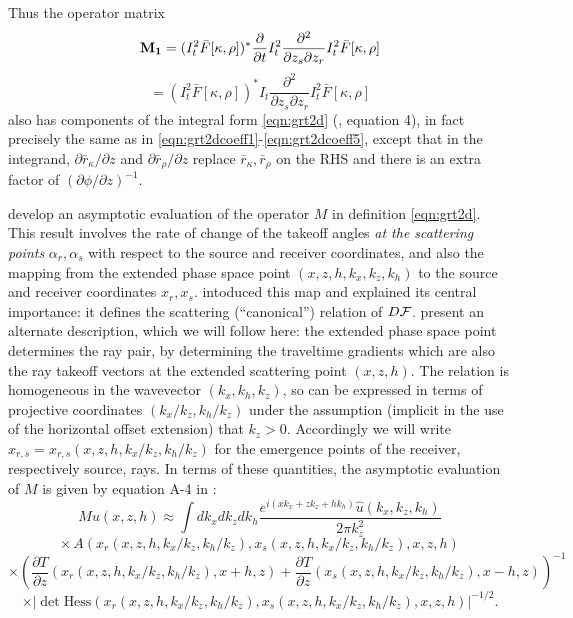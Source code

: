 Thus the operator matrix 
\[
{\bf M_1} = (I_t^2\bar{F}[\kappa,\rho])^{*}
\frac{\partial}{\partial t}I_t^2\frac{\partial^2}{\partial z_s \partial z_r}I_t^2\bar{F}[\kappa,\rho]
\]
\begin{equation}
\label{eqn:dwnopbis}
 = (I_t^2\bar{F}[\kappa,\rho])^{*}
I_t\frac{\partial^2}{\partial z_s \partial z_r}I_t^2\bar{F}[\kappa,\rho]
\end{equation}
also has components of the integral form \ref{eqn:grt2d}  
(\cite{HouSymes:17}, equation 4), in fact precisely the same as in
\ref{eqn:grt2dcoeff1}-\ref{eqn:grt2dcoeff5}, except that in the integrand,
$\partial \bar{r}_{\kappa}/\partial z$ and $\partial
\bar{r}_{\rho}/\partial z$ replace $\bar{r}_{\kappa},\bar{r}_{\rho}$ on the RHS and there is an extra factor of $(\partial
\phi/\partial z)^{-1}$.

\cite{HouSymes:17} develop an asymptotic evaluation
of the operator $M$ in definition \ref{eqn:grt2d}. 
This result involves the
rate of change of the takeoff angles {\em at the scattering points}
$\alpha_r,\alpha_s$ with respect to the source and receiver
coordinates, and also the mapping from the extended phase space point
$(x,z,h,k_x,k_z,k_h)$ to the source and receiver coordinates
$x_r,x_s$. \cite{tenKroode:12} intoduced this map and explained its
central importance: it defines the scattering (``canonical'') relation of
$D{\cal F}$. \cite{HouSymes:15} present an alternate description,
which we will follow here: the extended phase space
point determines the ray pair, by determining the traveltime gradients
which are also the ray takeoff vectors at the extended scattering
point $(x,z,h)$. The relation is homogeneous in the wavevector
$(k_x,k_h,k_z)$, so can be expressed in terms of projective
coordinates $(k_x/k_z,k_h/k_z)$ under the assumption (implicit in the
use of the horizontal offset extension) that $k_z > 0$. Accordingly we
will write $x_{r,s} = x_{r,s}(x,z,h,k_x/k_z,k_h/k_z)$ for the
emergence points of the receiver, respectively source, rays. In terms
of these quantities, the asymptotic evaluation of $M$ is given by
equation A-4 in \cite[]{HouSymes:17}:
\[
Mu(x,z,h) \approx \int 
dk_{x}dk_{z}dk_{h}\frac{e^{i(xk_{x}+zk_{z}+hk_{h})}\widehat{u}(k_{x},k_{z},k_{h})}{2\pi 
  k^2_z}
\]
\[
\times \, A(x_r(x,z,h,k_x/k_z,k_h/k_z),x_s(x,z,h,k_x/k_z,k_h/k_z),x,z,h) 
\]
\[
\times \left(\frac{\partial T}{\partial 
    z}(x_r(x,z,h,k_x/k_z,k_h/k_z),x+h,z) +
\frac{\partial T}{\partial 
    z}(x_s(x,z,h,k_x/k_z,k_h/k_z),x-h,z) \right)^{-1}
\]
\begin{equation}
\label{eqn:grt2deval}
\times |\det \mbox{
  Hess}(x_r(x,z,h,k_x/k_z,k_h/k_z),x_s(x,z,h,k_x/k_z,k_h/k_z),x,z,h)|^{-1/2} . 
\end{equation}
